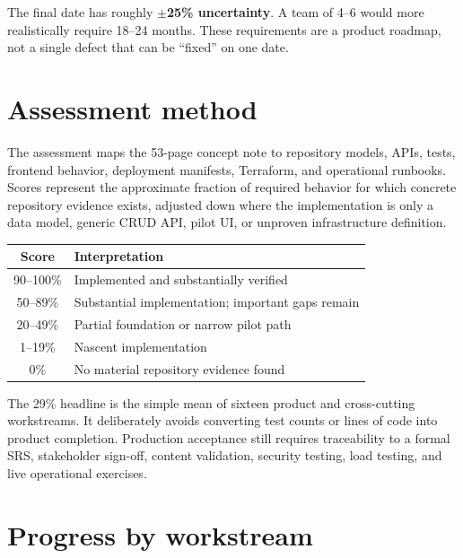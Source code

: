 \documentclass[11pt,a4paper]{article}
\begin{document}
The final date has roughly \textbf{$\pm$25\% uncertainty}. A team of 4--6 would
more realistically require 18--24 months. These requirements are a product roadmap,
not a single defect that can be ``fixed'' on one date.

\section{Assessment method}

The assessment maps the 53-page concept note to repository models, APIs, tests,
frontend behavior, deployment manifests, Terraform, and operational runbooks.
Scores represent the approximate fraction of required behavior for which concrete
repository evidence exists, adjusted down where the implementation is only a data
model, generic CRUD API, pilot UI, or unproven infrastructure definition.

\begin{center}
\begin{tabular}{cl}
\toprule
Score & Interpretation \\
\midrule
90--100\% & Implemented and substantially verified \\
50--89\% & Substantial implementation; important gaps remain \\
20--49\% & Partial foundation or narrow pilot path \\
1--19\% & Nascent implementation \\
0\% & No material repository evidence found \\
\bottomrule
\end{tabular}
\end{center}

The 29\% headline is the simple mean of sixteen product and cross-cutting
workstreams. It deliberately avoids converting test counts or lines of code into
product completion. Production acceptance still requires traceability to a formal
SRS, stakeholder sign-off, content validation, security testing, load testing, and
live operational exercises.

\section{Progress by workstream}
\end{document}
